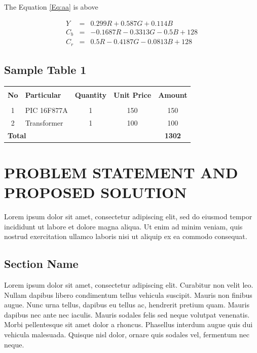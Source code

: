 \documentclass[12pt,a4paper]{report}
\begin{document}
The Equation \ref{Eq:aa} is above

\begin{eqnarray}
Y & = & 0.299R + 0.587G + 0.114B\\
C_b & = & -0.1687R - 0.3313G - 0.5B + 128\\
C_r & = & 0.5R - 0.4187G - 0.0813B + 128
\end{eqnarray}


\section{Sample  Table 1}

\begin{table}[h]
\begin{center}
\begin{tabular}{|c|l|c|c|c|}
 \hline
   &                          &          &            &        \\ 
 \textbf{No} & \textbf{Particular} & \textbf{Quantity} & \textbf{Unit Price} & \textbf{Amount} \\ 
   &                          &          &            &        \\ \hline
1  & PIC 16F877A              & 1        & 150        & 150    \\ \hline
2  & Transformer              & 1        & 100        & 100    \\ \hline
\multicolumn{4}{|l}{\textbf{Total}}               \vline              & \textbf{1302} \\  \hline    
\end{tabular}
\end{center}
\end{table}

 
 






\chapter{PROBLEM STATEMENT AND PROPOSED SOLUTION}
\thispagestyle{empty}
Lorem ipsum dolor sit amet, consectetur adipiscing elit, sed do eiusmod tempor incididunt ut labore et dolore magna aliqua. Ut enim ad minim veniam, quis nostrud exercitation ullamco laboris nisi ut aliquip ex ea commodo consequat. 


\section{Section Name}
Lorem ipsum dolor sit amet, consectetur adipiscing elit. Curabitur non velit leo. Nullam dapibus libero condimentum tellus vehicula suscipit. Mauris non finibus augue. Nunc urna tellus, dapibus eu tellus ac, hendrerit pretium quam. Mauris dapibus nec ante nec iaculis. Mauris sodales felis sed neque volutpat venenatis. Morbi pellentesque sit amet dolor a rhoncus. Phasellus interdum augue quis dui vehicula malesuada. Quisque nisl dolor, ornare quis sodales vel, fermentum nec neque. 
\end{document}
